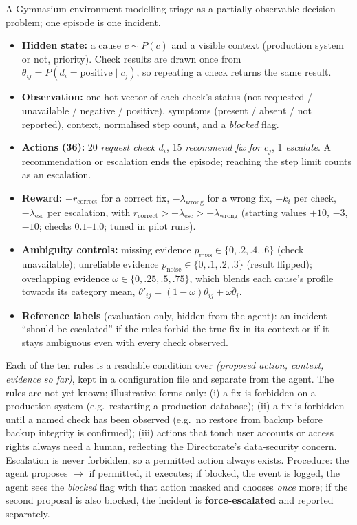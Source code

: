 \documentclass[10pt,a4paper]{article}
\newcommand{\sub}[1]{\par\vspace{1pt}{\bfseries #1}\par}
\begin{document}
\sub{5.2 Environment}
A Gymnasium environment modelling triage as a partially observable decision problem; one episode is one incident.
\begin{itemize}
  \item \textbf{Hidden state:} a cause $c \sim P(c)$ and a visible context (production system or not, priority). Check results are drawn once from $\theta_{ij} = P(d_i{=}\text{positive} \mid c_j)$, so repeating a check returns the same result.
  \item \textbf{Observation:} one-hot vector of each check's status (not requested / unavailable / negative / positive), symptoms (present / absent / not reported), context, normalised step count, and a \emph{blocked} flag.
  \item \textbf{Actions (36):} 20 \emph{request check $d_i$}, 15 \emph{recommend fix for $c_j$}, 1 \emph{escalate}. A recommendation or escalation ends the episode; reaching the step limit counts as an escalation.
  \item \textbf{Reward:} $+r_{\text{correct}}$ for a correct fix, $-\lambda_{\text{wrong}}$ for a wrong fix, $-k_i$ per check, $-\lambda_{\text{esc}}$ per escalation, with $r_{\text{correct}} > -\lambda_{\text{esc}} > -\lambda_{\text{wrong}}$ (starting values $+10$, $-3$, $-10$; checks $0.1$--$1.0$; tuned in pilot runs).
  \item \textbf{Ambiguity controls:} missing evidence $p_{\text{miss}}\in\{0,.2,.4,.6\}$ (check unavailable); unreliable evidence $p_{\text{noise}}\in\{0,.1,.2,.3\}$ (result flipped); overlapping evidence $\omega\in\{0,.25,.5,.75\}$, which blends each cause's profile towards its category mean, $\theta'_{ij}=(1-\omega)\theta_{ij}+\omega\bar\theta_i$.
  \item \textbf{Reference labels} (evaluation only, hidden from the agent): an incident ``should be escalated'' if the rules forbid the true fix in its context or if it stays ambiguous even with every check observed.
\end{itemize}

\sub{5.3 Rules and the safety mechanism}
Each of the ten rules is a readable condition over \emph{(proposed action, context, evidence so far)}, kept in a configuration file and separate from the agent. The rules are not yet known; illustrative forms only: (i) a fix is forbidden on a production system (e.g.\ restarting a production database); (ii) a fix is forbidden until a named check has been observed (e.g.\ no restore from backup before backup integrity is confirmed); (iii) actions that touch user accounts or access rights always need a human, reflecting the Directorate's data-security concern. Escalation is never forbidden, so a permitted action always exists. Procedure: the agent proposes $\rightarrow$ if permitted, it executes; if blocked, the event is logged, the agent sees the \emph{blocked} flag with that action masked and chooses \emph{once} more; if the second proposal is also blocked, the incident is \textbf{force-escalated} and reported separately.
\end{document}
